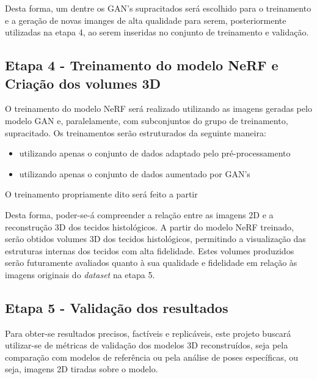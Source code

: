Desta forma, um dentre os GAN's supracitados será escolhido para o treinamento e a geração de novas imanges de alta qualidade para serem, posteriormente utilizadas na etapa 4, ao serem inseridas no conjunto de treinamento e validação.


\subsection{Etapa 4 - Treinamento do modelo NeRF e Criação dos volumes 3D}

O treinamento do modelo NeRF será realizado utilizando as imagens geradas pelo modelo GAN e, paralelamente, com subconjuntos do grupo de treinamento, supracitado. Os treinamentos serão estruturados da seguinte maneira:
\begin{itemize}
  \item utilizando apenas o conjunto de dados adaptado pelo pré-processamento
  \item utilizando apenas o conjunto de dados aumentado por GAN's
\end{itemize}

O treinamento propriamente dito será feito a partir

Desta forma, poder-se-á compreender a relação entre as imagens 2D e a reconstrução 3D dos tecidos histológicos. A partir do modelo NeRF treinado, serão obtidos volumes 3D dos tecidos histológicos, permitindo a visualização das estruturas internas dos tecidos com alta fidelidade. Estes volumes produzidos serão futuramente avaliados quanto à sua qualidade e fidelidade em relação às imagens originais do \textit{dataset} na etapa 5. 

\subsection{Etapa 5 - Validação dos resultados}

Para obter-se resultados precisos, factíveis e replicáveis, este projeto buscará utilizar-se de métricas de validação dos modelos 3D reconstruídos, seja pela comparação com modelos de referência ou pela análise de poses específicas, ou seja, imagens 2D tiradas sobre o modelo.

